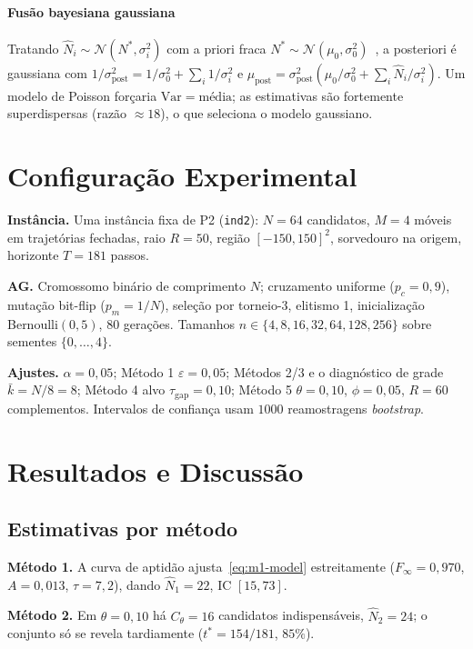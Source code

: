 \documentclass[conference]{IEEEtran}
\newcommand{\Nhat}{\hat{N}}
\begin{document}
\paragraph*{Fusão bayesiana gaussiana} Tratando
$\Nhat_i\sim\mathcal{N}(N^*,\sigma_i^2)$ com a priori fraca
$N^*\sim\mathcal{N}(\mu_0,\sigma_0^2)$~\cite{gelman2013bayesian}, a posteriori é
gaussiana com $1/\sigma_{\mathrm{post}}^2=1/\sigma_0^2+\sum_i 1/\sigma_i^2$ e
$\mu_{\mathrm{post}}=\sigma_{\mathrm{post}}^2(\mu_0/\sigma_0^2+\sum_i\Nhat_i/\sigma_i^2)$.
Um modelo de Poisson forçaria $\mathrm{Var}=\text{média}$; as estimativas são
fortemente superdispersas (razão $\approx 18$), o que seleciona o modelo gaussiano.

\section{Configuração Experimental}
\label{sec:setup}
\textbf{Instância.} Uma instância fixa de P2 (\texttt{ind2}): $N=64$ candidatos,
$M=4$ móveis em trajetórias fechadas, raio $R=50$, região $[-150,150]^2$,
sorvedouro na origem, horizonte $T=181$ passos.

\textbf{AG.} Cromossomo binário de comprimento $N$; cruzamento uniforme
($p_c=0{,}9$), mutação bit-flip ($p_m=1/N$), seleção por torneio-3, elitismo 1,
inicialização Bernoulli$(0{,}5)$, $80$ gerações. Tamanhos
$n\in\{4,8,16,32,64,128,256\}$ sobre sementes $\{0,\dots,4\}$.

\textbf{Ajustes.} $\alpha=0{,}05$; Método 1 $\varepsilon=0{,}05$; Métodos 2/3 e o
diagnóstico de grade $\bar k=N/8=8$; Método 4 alvo $\tau_{\mathrm{gap}}=0{,}10$;
Método 5 $\theta=0{,}10$, $\phi=0{,}05$, $R=60$ complementos. Intervalos de
confiança usam $1000$ reamostragens \emph{bootstrap}.

\section{Resultados e Discussão}
\label{sec:resultados}
\subsection{Estimativas por método}
\textbf{Método 1.} A curva de aptidão ajusta~\eqref{eq:m1-model} estreitamente
($F_\infty=0{,}970$, $A=0{,}013$, $\tau=7{,}2$), dando $\Nhat_1=22$, IC $[15,73]$.

\textbf{Método 2.} Em $\theta=0{,}10$ há $C_\theta=16$ candidatos indispensáveis,
$\Nhat_2=24$; o conjunto só se revela tardiamente ($t^*=154/181$, $85\%$).
\end{document}

